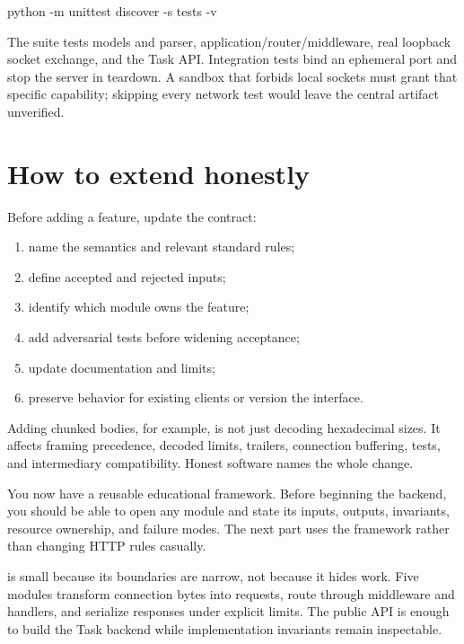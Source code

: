 \begin{wiremessage}
python -m unittest discover -s tests -v
\end{wiremessage}

The suite tests models and parser, application/router/middleware, real loopback
socket exchange, and the Task API. Integration tests bind an ephemeral port and
stop the server in teardown. A sandbox that forbids local sockets must grant that
specific capability; skipping every network test would leave the central
artifact unverified.

\section{How to extend honestly}

Before adding a feature, update the contract:

\begin{enumerate}
  \item name the semantics and relevant standard rules;
  \item define accepted and rejected inputs;
  \item identify which module owns the feature;
  \item add adversarial tests before widening acceptance;
  \item update documentation and limits;
  \item preserve behavior for existing clients or version the interface.
\end{enumerate}

Adding chunked bodies, for example, is not just decoding hexadecimal sizes. It
affects framing precedence, decoded limits, trailers, connection buffering,
tests, and intermediary compatibility. Honest software names the whole change.

\begin{checkpoint}
You now have a reusable educational framework. Before beginning the backend,
you should be able to open any module and state its inputs, outputs, invariants,
resource ownership, and failure modes. The next part uses the framework rather
than changing HTTP rules casually.
\end{checkpoint}

\summarytitle

 is small because its boundaries are narrow, not because it hides
work. Five modules transform connection bytes into requests, route through
middleware and handlers, and serialize responses under explicit limits. The
public API is enough to build the Task backend while implementation invariants
remain inspectable.

